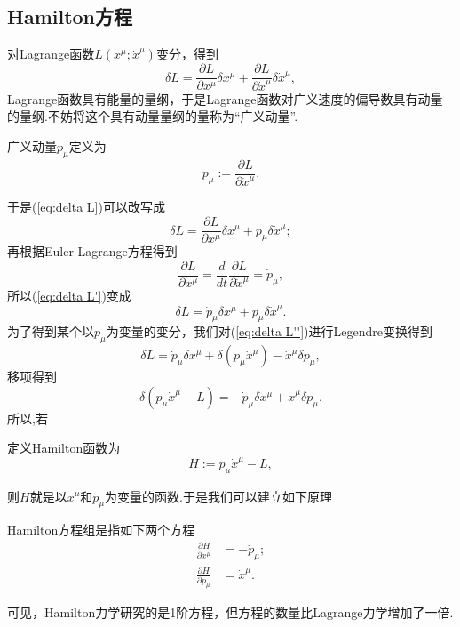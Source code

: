 \documentclass[10pt]{article}
\begin{document}
\subsection{Hamilton方程}
	对Lagrange函数$L(x^\mu;{\dot{x}}^\mu)$变分，得到
	\begin{equation}\label{eq:delta L}
	\delta L=\frac{\partial L}{\partial x^\mu}\delta x^\mu+\frac{\partial L}{\partial {\dot{x}}^\mu}\delta {\dot{x}}^\mu,
	\end{equation}
	Lagrange函数具有能量的量纲，于是Lagrange函数对广义速度的偏导数具有动量的量纲.不妨将这个具有动量量纲的量称为“广义动量”.
	\begin{definition}
	广义动量$p_\mu$定义为
	\begin{equation}
		p_\mu:=\frac{\partial L}{\partial {\dot{x}}^\mu}.
	\end{equation}
	\end{definition}
	于是(\ref{eq:delta L})可以改写成
	\begin{equation}\label{eq:delta L'}
	\delta L=\frac{\partial L}{\partial x^\mu}\delta x^\mu+p_\mu\delta {\dot{x}}^\mu;
	\end{equation}
	再根据Euler-Lagrange方程得到
	\begin{equation*}
	\frac{\partial L}{\partial x^\mu}=\frac{d}{dt}\frac{\partial L}{\partial {\dot{x}}^\mu}={\dot{p}}_\mu,
	\end{equation*}
	所以(\ref{eq:delta L'})变成
	\begin{equation}\label{eq:delta L''}
	\delta L={\dot{p}}_\mu\delta x^\mu+p_\mu\delta {\dot{x}}^\mu.
	\end{equation}
	为了得到某个以$p_\mu$为变量的变分，我们对(\ref{eq:delta L''})进行Legendre变换得到
	\begin{equation*}
	\delta L={\dot{p}}_\mu\delta x^\mu+\delta(p_\mu{\dot{x}}^\mu)-{\dot{x}}^\mu\delta p_\mu,
	\end{equation*}
	移项得到
	\begin{equation}\label{eq:delta H}
	\delta(p_\mu{\dot{x}}^\mu-L)=-{\dot{p}}_\mu\delta x^\mu+{\dot{x}}^\mu\delta p_\mu.
	\end{equation}
	所以,若
	\begin{definition}
	定义Hamilton函数为
	\begin{equation}
		H:=p_\mu{\dot{x}}^\mu-L,
	\end{equation}
	\end{definition}
	则$H$就是以$x^\mu$和$p_\mu$为变量的函数.于是我们可以建立如下原理
	\begin{theorem}
	Hamilton方程组是指如下两个方程
	\begin{equation}
		\begin{split}\label{eq:H}
			\frac{\partial H}{\partial x^\mu}&=-{\dot{p}}_\mu;\\
			\frac{\partial H}{\partial p_\mu}&={\dot{x}}^\mu.
		\end{split}
	\end{equation}
	\end{theorem}
	可见，Hamilton力学研究的是1阶方程，但方程的数量比Lagrange力学增加了一倍.
\end{document}
